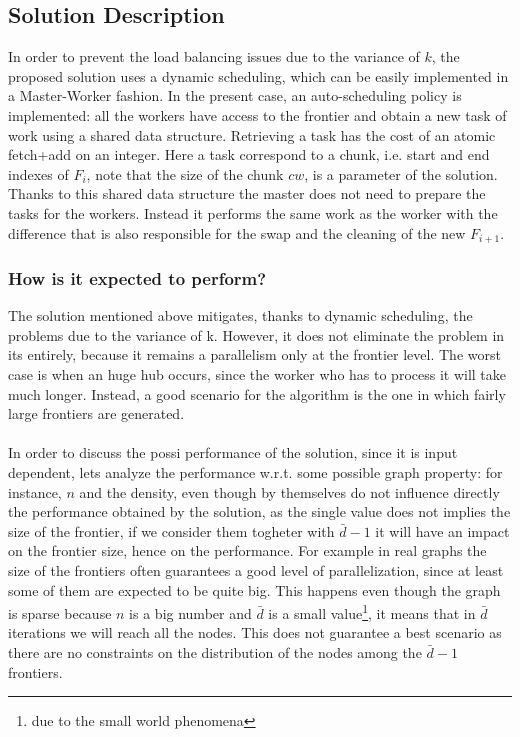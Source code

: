 \subsection{Solution Description}
In order to prevent the load balancing issues 
due to the variance of $k$, the proposed solution
uses a dynamic scheduling, which can be easily implemented
in a Master-Worker fashion. In the
present case, an auto-scheduling policy is implemented:  all the workers have access to the frontier
and obtain a new task of work using a shared
data structure. Retrieving a task has the cost of an
atomic fetch+add on an integer. Here a task correspond to a chunk, i.e.
 start and end indexes of $F_i$, note that the size of the chunk $cw$,
 is a parameter of the solution. Thanks to this shared data structure
 the master does not need to
 prepare the tasks for the workers. Instead it performs the same work as 
 the worker with the difference that is also responsible for 
 the swap and the cleaning of the new $F_{i+1}$. 
\subsubsection{How is it expected to perform?}
The solution mentioned above mitigates, thanks to dynamic scheduling,
 the problems due to the variance of k.
 However, it does not eliminate the
  problem in its entirely, because it remains 
 a parallelism only at the frontier level.
 The worst case is when an huge hub occurs, 
 since the worker who has to process it
 will take much longer. Instead, 
 a good scenario for the algorithm is the one in which
 fairly large frontiers are generated.
 \\
 \\
In order to discuss the possi performance of the solution, since it
is input dependent, lets analyze the performance w.r.t. some possible
graph property:  for instance, $n$ and the density,
even though by themselves do not influence directly the performance obtained by the solution,
as the single value does not implies the size of the frontier, if we consider
them togheter with $\bar{d}-1$ it will have an impact on the frontier size, hence on the performance.
For example in real graphs the size of the frontiers often guarantees
a good level of parallelization, since at least some of them are expected 
to be quite big. 
This happens even though the graph is sparse because $n$ is a big number 
and $\bar{d}$ is a small value\footnote{due to the small world phenomena}, it means that in $\bar{d}$ iterations we will reach all the nodes.
This does not guarantee a best scenario as there are no constraints on the distribution of the nodes
  among the $\bar{d}-1$ frontiers. 


